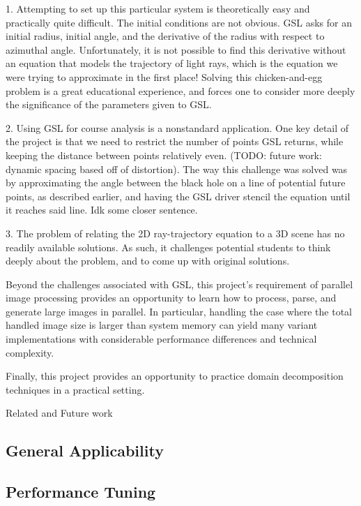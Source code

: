 1. Attempting to set up this particular system is theoretically easy and practically quite difficult. The initial conditions are not obvious. GSL asks for an initial radius, initial angle, and the derivative of the radius with respect to azimuthal angle. Unfortunately, it is not possible to find this derivative without an equation that models the trajectory of light rays, which is the equation we were trying to approximate in the first place! Solving this chicken-and-egg problem is a great educational experience, and forces one to consider more deeply the significance of the parameters given to GSL. 

2. Using GSL for course analysis is a nonstandard application. One key detail of the project is that we need to restrict the number of points GSL returns, while keeping the distance between points relatively even. (TODO: future work: dynamic spacing based off of distortion). The way this challenge was solved was by approximating the angle between the black hole on a line of potential future points, as described earlier, and having the GSL driver stencil the equation until it reaches said line. Idk some closer sentence.

3. The problem of relating the 2D ray-trajectory equation to a 3D scene has no readily available solutions. As such, it challenges potential students to think deeply about the problem, and to come up with original solutions.

Beyond the challenges associated with GSL, this project's requirement of parallel image processing provides an opportunity to learn how to process, parse, and generate large images in parallel. In particular, handling the case where the total handled image size is larger than system memory can yield many variant implementations with considerable performance differences and technical complexity. 

Finally, this project provides an opportunity to practice domain decomposition techniques in a practical setting. %

Related and Future work

\subsection {General Applicability}
\subsection {Performance Tuning}
